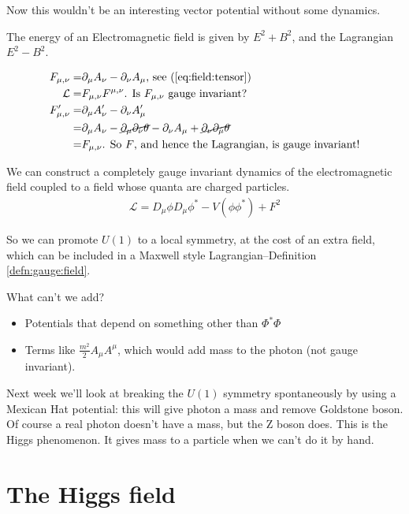 \documentclass[]{article}
\begin{document}
Now this wouldn't be an interesting vector potential without some dynamics.

The energy of an Electromagnetic field is given by $E^2 + B^2$, and the Lagrangian $E^2-B^2$.

\begin{align*} 
	F_{\mu,\nu} =& \partial_\mu A_\nu - \partial_\nu A_\mu \text{, see (\ref{eq:field:tensor})}\\
	\mathcal{L} =& F_{\mu,\nu} F^{\mu,\nu} \text{. Is $F_{\mu,\nu}$ gauge invariant? }\\
	F_{\mu,\nu}^\prime =&\partial_\mu A_\nu^\prime - \partial_\nu A_\mu^\prime\\
	=& \partial_\mu A_\nu - \cancel{\partial_\mu \partial_\nu \theta}-\partial_\nu A_\mu + \cancel{\partial_\nu \partial_\mu \theta}\\
	=& 	F_{\mu,\nu} \text{. So $F$, and hence the Lagrangian, is gauge invariant!}
\end{align*}

We can construct a completely gauge invariant dynamics of the electromagnetic field coupled to a field whose quanta are charged particles.
\begin{align*}
	\mathcal{L} = D_\mu \phi D_\mu \phi^* -V(\phi\phi^*) + F^2
\end{align*}

So we can promote $U(1)$ to a local symmetry, at the cost of an extra field, which can be included in a Maxwell style Lagrangian--Definition \ref{defn:gauge:field}.

What can't we add?

\begin{itemize}
	\item Potentials that depend on something other than $\Phi^*\Phi$ 
	\item Terms like $\frac{m^2}{2}A_\mu A^\mu$, which would add mass to the photon (not gauge invariant).
\end{itemize}

Next week we'll look at breaking the $U(1)$ symmetry spontaneously by using a Mexican Hat potential: this will give photon a mass and remove Goldstone boson. Of course a real photon doesn't have a mass, but the Z boson does. This is the Higgs phenomenon. It gives mass to a particle when we can't do it by hand.

\section{The Higgs field}
\end{document}
